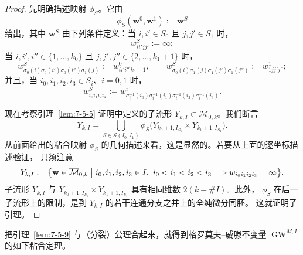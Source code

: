 \begin{proof}
先明确描述映射 $\phi_S$。它由
\[
  \phi_S(\mathbf w^0,\mathbf w^1):=\mathbf w^S
\]
给出，其中 $\mathbf w^S$ 由下列条件定义：当
$i,i'\in S_0$ 且 $j,j'\in S_1$ 时，
\[
  w^S_{ii'jj'}:=\infty;
\]
当 $i,i',i''\in\{1,\ldots,k_0\}$ 且
$j,j',j''\in\{2,\ldots,k_1+1\}$ 时，
\[
  w^S_{\sigma_0(i)\sigma_0(i')\sigma_0(i'')\sigma_1(j)}
  :=w^0_{ii'i''\,k_0+1},
  \qquad
  w^S_{\sigma_0(i)\sigma_1(j)\sigma_1(j')\sigma_1(j'')}
  :=w^1_{1jj'j''};
\]
并且，当 $i_0,i_1,i_2,i_3\in S_i$、$i=0,1$ 时，
\[
  w^S_{i_0i_1i_2i_3}
  :=w^i_{\sigma_i^{-1}(i_0)\sigma_i^{-1}(i_1)
              \sigma_i^{-1}(i_2)\sigma_i^{-1}(i_3)}.
\]

现在考察引理~\ref{lem:7-5-5} 证明中定义的子流形
$Y_{k,I}\subset\overline{\mathcal M}_{0,k}$。我们断言
\[
  Y_{k,I}
  =\bigcup_{S\in\mathcal S(I_0,I_1)}
    \phi_S\bigl(Y_{k_0+1,I_{S_0}}\times Y_{k_1+1,I_{S_1}}\bigr).
\]
从前面给出的粘合映射 $\phi_S$ 的几何描述来看，这是显然的。若要从上面的逐坐标描述验证，
只须注意
\[
  Y_{k,I}:=\bigl\{\mathbf w\in\overline{\mathcal M}_{0,k}\bigm|
  i_0,i_1,i_2,i_3\in I,\ i_0<i_1<i_2<i_3
  \Longrightarrow w_{i_0i_1i_2i_3}=\infty\bigr\}.
\]
子流形 $Y_{k,I}$ 与
$Y_{k_0+1,I_{S_0}}\times Y_{k_1+1,I_{S_1}}$ 具有相同维数 $2(k-\#I)$。此外，
$\phi_S$ 在后一子流形上的限制，是到 $Y_{k,I}$ 的若干连通分支之并上的全纯微分同胚。
这就证明了引理。
\end{proof}

把引理~\ref{lem:7-5-9} 与（分裂）公理合起来，就得到格罗莫夫--威滕不变量
$\operatorname{GW}^{M,I}$ 的如下粘合定理。

